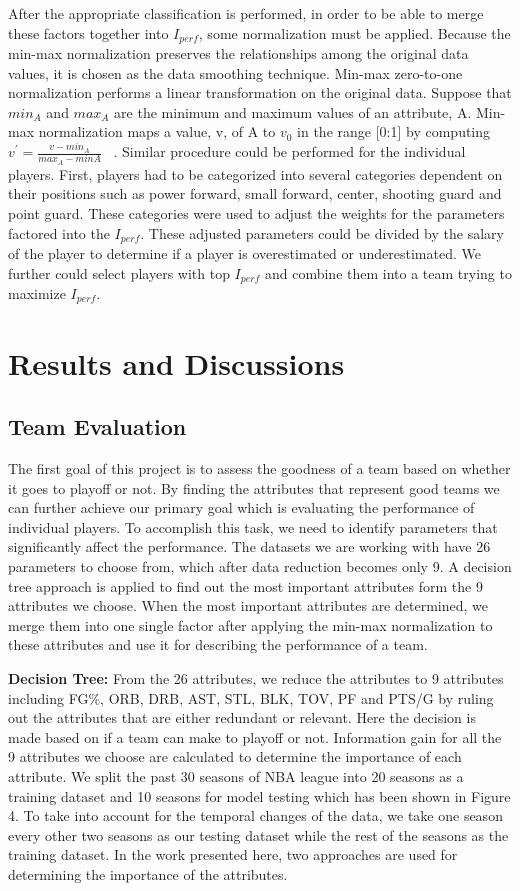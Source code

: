 \documentclass{acm_proc_article-sp}
\begin{document}
After the appropriate classification is performed, in order to be able to merge these factors together into $I_{perf}$, some normalization must be applied. Because the min-max normalization preserves the relationships among the original data values, it is chosen as the data smoothing technique. Min-max zero-to-one normalization performs a linear transformation on the original data. Suppose that $min_{A}$ and $max_{A}$ are the minimum and maximum values of an attribute, A. Min-max normalization maps a value, v, of A to $v_{0}$ in the range [0:1] by computing $v^{'} = \frac{v - min_{A}}{max_{A}-min{A}}$     ~\cite{G}. Similar procedure could be performed for the individual players. First, players had to be categorized into several categories dependent on their positions such as power forward, small forward, center, shooting guard and point guard. These categories were used to adjust the weights for the parameters factored into the $I_{perf}$. These adjusted parameters could be divided by the salary of the player to determine if a player is overestimated or underestimated. We further could select players with top $I_{perf}$ and combine them into a team trying to maximize $I_{perf}$.


\section{Results and Discussions}
\vspace{0.5em}
\subsection{Team Evaluation}
The first goal of this project is to assess the goodness of a team based on whether it goes to playoff or not. By finding the attributes that represent good teams we can further achieve our primary goal which is evaluating the performance of individual players. To accomplish this task, we need to identify parameters that significantly affect the performance. The datasets we are working with have 26 parameters to choose from, which after data reduction becomes only 9. A decision tree approach is applied to find out the most important attributes form the 9 attributes we choose. When the most important attributes are determined, we merge them into one single factor after applying the min-max normalization to these attributes and use it for describing the performance of a team.

\textbf{Decision Tree: } From the 26 attributes, we reduce the attributes to 9 attributes including FG\%, ORB, DRB, AST, STL, BLK, TOV, PF and PTS/G by ruling out the attributes that are either redundant or relevant. Here the decision is made based on if a team can make to playoff or not. Information gain for all the 9 attributes we choose are calculated to determine the importance of each attribute. We split the past 30 seasons of NBA league into 20 seasons as a training dataset and 10 seasons for model testing which has been shown in Figure 4. To take into account for the temporal changes of the data, we take one season every other two seasons as our testing dataset while the rest of the seasons as the training dataset. In the work presented here, two approaches are used for determining the importance of the attributes. 
\end{document}
